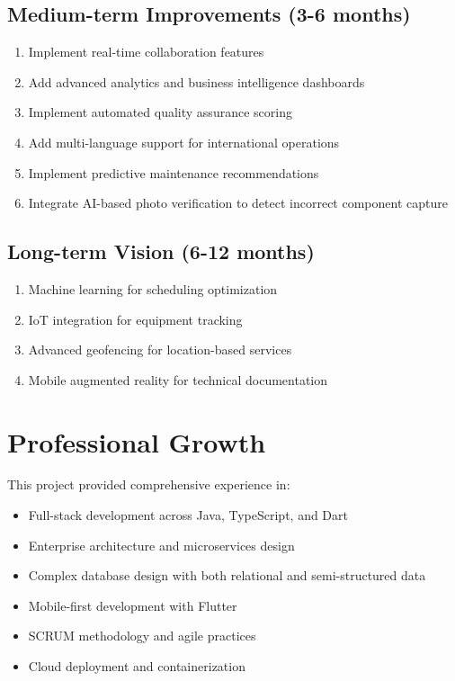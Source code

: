 \subsection*{Medium-term Improvements (3-6 months)}

\begin{enumerate}
\item Implement real-time collaboration features
\item Add advanced analytics and business intelligence dashboards
\item Implement automated quality assurance scoring
\item Add multi-language support for international operations
\item Implement predictive maintenance recommendations
\item Integrate AI-based photo verification to detect incorrect component capture
\end{enumerate}

\subsection*{Long-term Vision (6-12 months)}

\begin{enumerate}
\item Machine learning for scheduling optimization
\item IoT integration for equipment tracking
\item Advanced geofencing for location-based services
\item Mobile augmented reality for technical documentation
\end{enumerate}

\section*{Professional Growth}

This project provided comprehensive experience in:

\begin{itemize}
\item Full-stack development across Java, TypeScript, and Dart
\item Enterprise architecture and microservices design
\item Complex database design with both relational and semi-structured data
\item Mobile-first development with Flutter
\item SCRUM methodology and agile practices
\item Cloud deployment and containerization
\end{itemize}

